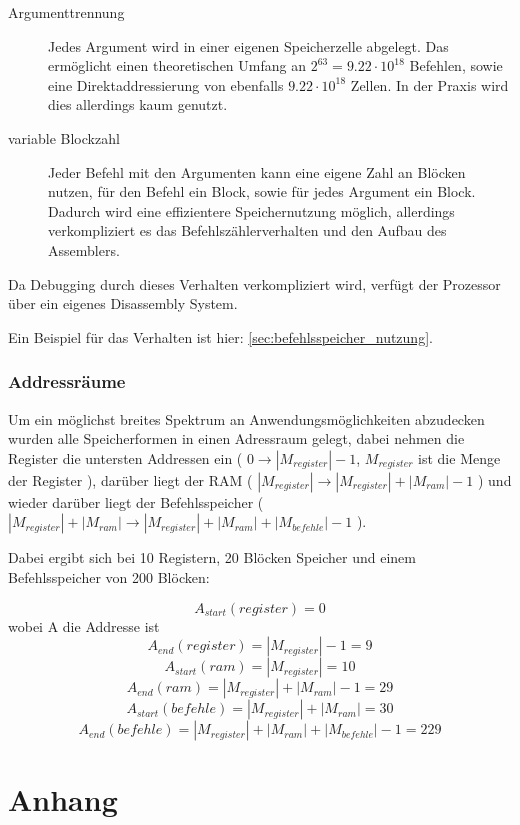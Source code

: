 \documentclass[a4paper,12pt,oneside]{scrreprt}
\begin{document}
\begin{description}
\item[Argumenttrennung] Jedes Argument wird in einer eigenen Speicherzelle abgelegt.
Das ermöglicht einen theoretischen Umfang an $ 2^{63} = 9.22 \cdot 10^{18} $ Befehlen, sowie eine
Direktaddressierung von ebenfalls $ 9.22 \cdot 10^{18} $ Zellen. In der Praxis wird dies allerdings kaum genutzt.

\item[variable Blockzahl] Jeder Befehl mit den Argumenten kann eine eigene Zahl an Blöcken nutzen, für den Befehl ein Block, sowie für jedes Argument ein Block. Dadurch wird eine effizientere Speichernutzung möglich, allerdings verkompliziert es das Befehlszählerverhalten und den Aufbau des Assemblers.
\end{description}

Da Debugging durch dieses Verhalten verkompliziert wird, verfügt der Prozessor über ein eigenes Disassembly System.

Ein Beispiel für das Verhalten ist hier: \ref{sec:befehlsspeicher_nutzung}.

\section{Addressräume}

Um ein möglichst breites Spektrum an Anwendungsmöglichkeiten abzudecken wurden alle Speicherformen in einen Adressraum gelegt,
dabei nehmen die Register die untersten Addressen ein ( $ 0 \rightarrow |M_{register}| - 1 $, $ M_{register}  $ ist die Menge der Register ), darüber liegt der RAM
( $ |M_{register}| \rightarrow |M_{register}| + |M_{ram}| - 1 $ ) und wieder darüber liegt der Befehlsspeicher 
( $ |M_{register}| + |M_{ram}| \rightarrow |M_{register}| + |M_{ram}| + |M_{befehle}| - 1 $ ).

Dabei ergibt sich bei 10 Registern, 20 Blöcken Speicher und einem Befehlsspeicher von 200 Blöcken:

$$ A_{start}(register) = 0 $$
wobei A die Addresse ist
$$ A_{end}(register) = |M_{register}| -1 = 9 $$
$$ A_{start}(ram) = |M_{register}| = 10 $$
$$ A_{end}(ram) = |M_{register}| + |M_{ram}| -1 = 29 $$
$$ A_{start}(befehle) = |M_{register}| + |M_{ram}| = 30 $$
$$ A_{end}(befehle) = |M_{register}| + |M_{ram}| + |M_{befehle}| - 1 = 229 $$

\part{Anhang}
\end{document}
